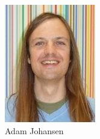 \documentclass[aspectratio=169]{beamer}
\begin{document}
\begin{frame}
\begin{columns}
\begin{column}{0.2\textwidth}
\includegraphics[width=\textwidth]{adam.jpg}\\
Adam Johansen
\end{column}
\begin{column}{0.2\textwidth}
\centering

\end{column}
\end{columns}
\end{frame}
\end{document}
